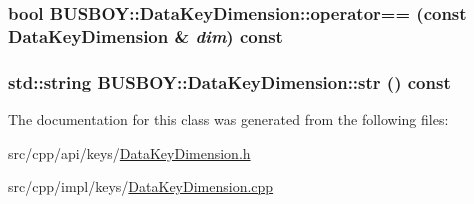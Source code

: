 \label{classBUSBOY_1_1DataKeyDimension_a557e765ae27d18960aca52a00cc84e3a}
\hypertarget{classBUSBOY_1_1DataKeyDimension_acdc0be3857a640397fbd86e432c8fef3}{
\subsubsection[{operator==}]{\setlength{\rightskip}{0pt plus 5cm}bool BUSBOY::DataKeyDimension::operator== (const {\bf DataKeyDimension} \& {\em dim}) const}}
\label{classBUSBOY_1_1DataKeyDimension_acdc0be3857a640397fbd86e432c8fef3}
\hypertarget{classBUSBOY_1_1DataKeyDimension_a0ad557b71ebb60017aed7c4bbe79aa4e}{
\subsubsection[{str}]{\setlength{\rightskip}{0pt plus 5cm}std::string BUSBOY::DataKeyDimension::str () const}}
\label{classBUSBOY_1_1DataKeyDimension_a0ad557b71ebb60017aed7c4bbe79aa4e}


The documentation for this class was generated from the following files:\begin{DoxyCompactItemize}
\item 
src/cpp/api/keys/\hyperlink{DataKeyDimension_8h}{DataKeyDimension.h}\item 
src/cpp/impl/keys/\hyperlink{DataKeyDimension_8cpp}{DataKeyDimension.cpp}\end{DoxyCompactItemize}
